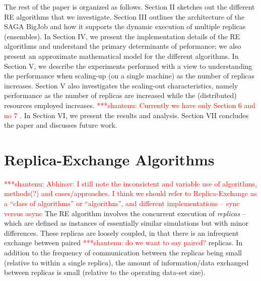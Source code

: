 \documentclass{rspublic}
\newcommand{\jhanote}[1]{ {\textcolor{red} { ***shantenu: #1 }}}
\newcommand{\alnote}[1]{ {\textcolor{blue} { ***andre: #1 }}}
\newcommand{\alnote}[1]{}
\newcommand{\jhanote}[1]{}
\begin{document}
The rest of the paper is organized as follows. Section II sketches out
the different RE algorithms that we investigate. Section III outlines
the architecture of the SAGA BigJob and how it supports the dynamic
execution of multiple replicas (ensembles). In Section IV, we present
the implementation details of the RE algorithms and understand
the primary determinants of peformance; we also present
an approximate mathematical model for the different algorithms.
In Section V, we describe the experiments performed with a view to
understanding the performance when scaling-up (on a single machine) as
the number of replicas increases. Section V also investigates the
scaling-out characteristics, namely performance as the number of
replicas are increased while the (distributed) resources employed
increases. %
\jhanote{Currently we have only Section 6 and no 7}. In Section VI, we
present the results and analysis.  Section VII concludes the paper and
discusses future work.


\section{Replica-Exchange Algorithms}
\label{sec:repex-approach}
\jhanote{Abhinav: I still note the inconsistent and variable use of
  algorithms, methods(?) and cases/approaches. I think we should refer
  to Replica-Exchange as a ``class of algorithms'' or ``algorithm'',
  and different implementations -- sync versus async} The RE algorithm
involves the concurrent execution of \emph{replicas} -- which are
defined as instances of essentially similar simulations but with minor
differences. These replicas are loosely coupled, in that there is an
infrequent exchange between paired \jhanote{do we want to say paired?}
replicas. In addition to the frequency of communication between the
replicas being small (relative to within a single replica), the amount
of information/data exchanged between replicas is small (relative to
the operating data-set size).

\end{document}
